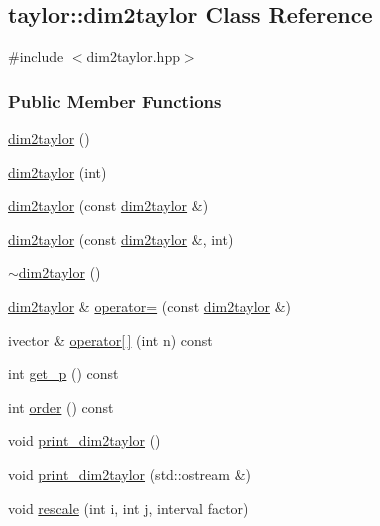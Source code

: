 \hypertarget{classtaylor_1_1dim2taylor}{\subsection{taylor\-:\-:dim2taylor \-Class \-Reference}
\label{classtaylor_1_1dim2taylor}
}


{\ttfamily \#include $<$dim2taylor.\-hpp$>$}

\subsubsection*{\-Public \-Member \-Functions}
\begin{DoxyCompactItemize}
\item 
\hyperlink{classtaylor_1_1dim2taylor_af42deea4555d3e27017799d98c889d19}{dim2taylor} ()
\item 
\hyperlink{classtaylor_1_1dim2taylor_ad7ee9b4029a65ec750e8be8f2a4241d2}{dim2taylor} (int)
\item 
\hyperlink{classtaylor_1_1dim2taylor_a95930d83a52a47f2547591fce0283c16}{dim2taylor} (const \hyperlink{classtaylor_1_1dim2taylor}{dim2taylor} \&)
\item 
\hyperlink{classtaylor_1_1dim2taylor_a7216581b3f89d2ef618e1ec3412056c2}{dim2taylor} (const \hyperlink{classtaylor_1_1dim2taylor}{dim2taylor} \&, int)
\item 
\hyperlink{classtaylor_1_1dim2taylor_a910e9d2b6f8df7e08c6993039475b8b3}{$\sim$dim2taylor} ()
\item 
\hyperlink{classtaylor_1_1dim2taylor}{dim2taylor} \& \hyperlink{classtaylor_1_1dim2taylor_aadd57620043591d41cd62f6b28299d8f}{operator=} (const \hyperlink{classtaylor_1_1dim2taylor}{dim2taylor} \&)
\item 
ivector \& \hyperlink{classtaylor_1_1dim2taylor_ab8e423651b66d8d139153d6cc33efbd7}{operator\mbox{[}$\,$\mbox{]}} (int n) const 
\item 
int \hyperlink{classtaylor_1_1dim2taylor_a060b69225e4e25f12c4366cd5d626500}{get\-\_\-p} () const 
\item 
int \hyperlink{classtaylor_1_1dim2taylor_afd9dcb9af56af0136cf009c039542fc9}{order} () const 
\item 
void \hyperlink{classtaylor_1_1dim2taylor_a36fc3e017a76b47429978bf04580809c}{print\-\_\-dim2taylor} ()
\item 
void \hyperlink{classtaylor_1_1dim2taylor_a9ab021c4d972c15bf8785d54cb827f09}{print\-\_\-dim2taylor} (std\-::ostream \&)
\item 
void \hyperlink{classtaylor_1_1dim2taylor_a70d5bbe4a35c69b21f57e4924153029a}{rescale} (int i, int j, interval factor)
\end{DoxyCompactItemize}
